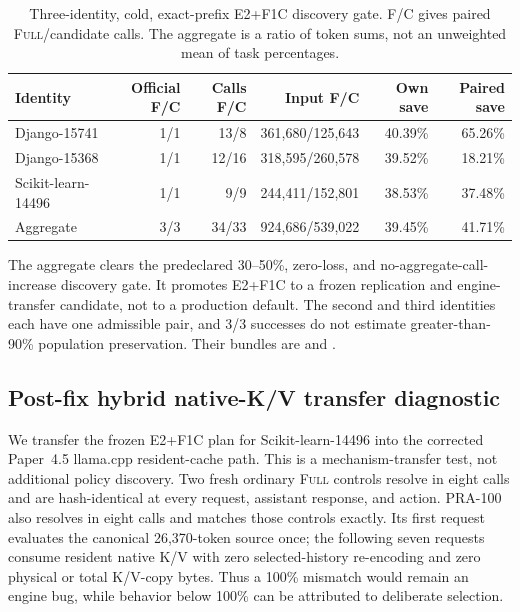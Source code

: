 \documentclass[11pt]{article}
\begin{document}
\begin{table}[H]
\centering
\footnotesize
\caption{Three-identity, cold, exact-prefix E2+F1C discovery gate.  F/C gives
paired \textsc{Full}/candidate calls.  The aggregate is a ratio of token sums,
not an unweighted mean of task percentages.}
\label{tab:heldout-cold-three-task}
\begin{tabular}{lrrrrr}
\toprule
Identity & Official F/C & Calls F/C & Input F/C & Own save & Paired save \\
\midrule
Django-15741 & 1/1 & 13/8 & 361,680/125,643 & 40.39\% & 65.26\% \\
Django-15368 & 1/1 & 12/16 & 318,595/260,578 & 39.52\% & 18.21\% \\
Scikit-learn-14496 & 1/1 & 9/9 & 244,411/152,801 & 38.53\% & 37.48\% \\
\midrule
Aggregate & 3/3 & 34/33 & 924,686/539,022 & 39.45\% & 41.71\% \\
\bottomrule
\end{tabular}
\end{table}

The aggregate clears the predeclared 30--50\%, zero-loss, and
no-aggregate-call-increase discovery gate.  It promotes E2+F1C to a frozen
replication and engine-transfer candidate, not to a production default.  The
second and third identities each have one admissible pair, and 3/3 successes
do not estimate greater-than-90\% population preservation.  Their bundles are
 and
.

\subsection{Post-fix hybrid native-K/V transfer diagnostic}

We transfer the frozen E2+F1C plan for Scikit-learn-14496 into the corrected
Paper~4.5 llama.cpp resident-cache path.  This is a mechanism-transfer test,
not additional policy discovery.  Two fresh ordinary \textsc{Full} controls
resolve in eight calls and are hash-identical at every request, assistant
response, and action.  PRA-100 also resolves in eight calls and matches those
controls exactly.  Its first request evaluates the canonical 26,370-token
source once; the following seven requests consume resident native K/V with
zero selected-history re-encoding and zero physical or total K/V-copy bytes.
Thus a 100\% mismatch would remain an engine bug, while behavior below 100\%
can be attributed to deliberate selection.
\end{document}
